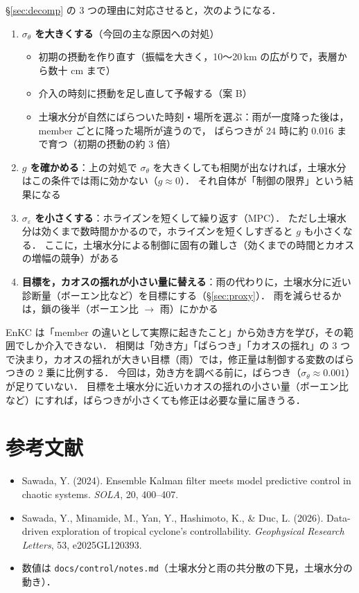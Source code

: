 \documentclass[dvipdfmx,a4paper,10.5pt]{jarticle}
\numberwithin{equation}{section}
\begin{document}
\S\ref{sec:decomp} の 3 つの理由に対応させると，次のようになる．
\begin{enumerate}
  \item \textbf{$\sigma_\theta$ を大きくする}（今回の主な原因への対処）
    \begin{itemize}
      \item 初期の摂動を作り直す（振幅を大きく，10〜20\,km の広がりで，表層から数十 cm まで）
      \item 介入の時刻に摂動を足し直して予報する（案 B）
      \item 土壌水分が自然にばらついた時刻・場所を選ぶ：雨が一度降った後は，member ごとに降った場所が違うので，
            ばらつきが 24 時に約 0.016 まで育つ（初期の摂動の約 3 倍）
    \end{itemize}
  \item \textbf{$g$ を確かめる}：上の対処で $\sigma_\theta$ を大きくしても相関が出なければ，土壌水分はこの条件では雨に効かない（$g\approx0$）．
        それ自体が「制御の限界」という結果になる
  \item \textbf{$\sigma_\varepsilon$ を小さくする}：ホライズンを短くして繰り返す（MPC）．
        ただし土壌水分は効くまで数時間かかるので，ホライズンを短くしすぎると $g$ も小さくなる．
        ここに，土壌水分による制御に固有の難しさ（効くまでの時間とカオスの増幅の競争）がある
  \item \textbf{目標を，カオスの揺れが小さい量に替える}：雨の代わりに，土壌水分に近い診断量（ボーエン比など）を目標にする（\S\ref{sec:proxy}）．
        雨を減らせるかは，鎖の後半（ボーエン比 $\to$ 雨）にかかる
\end{enumerate}

\begin{point}[title=まとめ]
EnKC は「member の違いとして実際に起きたこと」から効き方を学び，その範囲でしか介入できない．
相関は「効き方」「ばらつき」「カオスの揺れ」の 3 つで決まり，カオスの揺れが大きい目標（雨）では，修正量は制御する変数のばらつきの 2 乗に比例する．
今回は，効き方を調べる前に，ばらつき（$\sigma_\theta\approx0.001$）が足りていない．
目標を土壌水分に近いカオスの揺れの小さい量（ボーエン比など）にすれば，ばらつきが小さくても修正は必要な量に届きうる．
\end{point}

\section*{参考文献}
\begin{itemize}
  \item Sawada, Y. (2024). Ensemble Kalman filter meets model predictive control in chaotic systems. \textit{SOLA}, 20, 400--407.
  \item Sawada, Y., Minamide, M., Yan, Y., Hashimoto, K., \& Duc, L. (2026). Data-driven exploration of tropical cyclone's controllability.
        \textit{Geophysical Research Letters}, 53, e2025GL120393.
  \item 数値は \texttt{docs/control/notes.md}（土壌水分と雨の共分散の下見，土壌水分の動き）．
\end{itemize}
\end{document}
